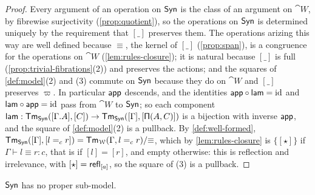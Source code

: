 \begin{proof}
    Every argument of an operation on $\mathsf{Syn}$ is the class of an argument on $\cat{W}$, by fibrewise surjectivity (\cref{prop:quotient}), so the operations on $\mathsf{Syn}$ is determined uniquely by the requirement that $[\_]$ preserves them. The operations arizing this way are well defined because $\equiv$, the kernel of $[\_]$ (\cref{prop:span}), is a congruence for the operations on $\cat{W}$ (\cref{lem:rules-closure}); it is natural because $[\_]$ is full (\cref{prop:trivial-fibrations}(2)) and preserves the actions; and the squares of \cref{def:model}(2) and (3) commute on $\mathsf{Syn}$ because they do on $\cat{W}$ and $[\_]$ preserves $\varpi$. In particular $\mathsf{app}$ descends, and the identities $\mathsf{app} \circ \mathsf{lam} = \mathrm{id}$ and $\mathsf{lam} \circ \mathsf{app} = \mathrm{id}$ pass from $\cat{W}$ to $\mathsf{Syn}$; so each component $\mathsf{lam} : \mathsf{Tm}_{\mathsf{Syn}}([\Gamma.A], [C]) \to \mathsf{Tm}_{\mathsf{Syn}}([\Gamma], [\mathsf{\Pi}(A, C)])$ is a bijection with inverse $\mathsf{app}$, and the square of \cref{def:model}(2) is a pullback. By \cref{def:well-formed}, $\mathsf{Tm}_{\mathsf{Syn}}([\Gamma], [l =_c r]) = \mathsf{Tm}_{\mathcal{W}}(\Gamma, l =_c r)/{\equiv}$, which by \cref{lem:rules-closure} is $\{[\star]\}$ if $\Gamma \vdash l \equiv r : c$, that is if $[l] = [r]$, and empty otherwise: this is reflection and irrelevance, with $[\star] = \mathsf{refl}_{[a]}$, so the square of (3) is a pullback.
\end{proof}

\begin{proposition}\label{prop:minimality}
    $\mathsf{Syn}$ has no proper sub-model.
\end{proposition}

